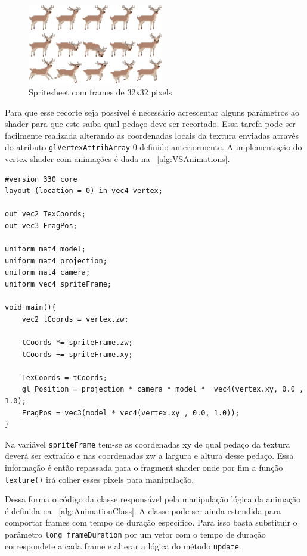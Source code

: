 \documentclass[12pt, 
openright, 
oneside, 
a4paper,    
brazil]{facom-ufu-abntex2}
\begin{document}
\begin{figure}[H]
	\centering
	\includegraphics[width=16em]{imagens/spritesheet.png}
	\caption{Spritesheet com frames de 32x32 pixels}
	\label{fig:spritesheetExample}
\end{figure}
Para que esse recorte seja possível é necessário acrescentar alguns parâmetros ao shader para que este saiba qual pedaço deve ser recortado. Essa tarefa pode ser facilmente realizada alterando as coordenadas locais da textura enviadas através do atributo \texttt{glVertexAttribArray} 0 definido anteriormente. A implementação do vertex shader com animações é dada na \lstlistingname~\ref{alg:VSAnimations}.


\begin{lstlisting}[caption=Vertex shader com animações, label={alg:VSAnimations}]
#version 330 core
layout (location = 0) in vec4 vertex;

out vec2 TexCoords;
out vec3 FragPos;

uniform mat4 model;
uniform mat4 projection;
uniform mat4 camera;
uniform vec4 spriteFrame;

void main(){
	vec2 tCoords = vertex.zw;

	tCoords *= spriteFrame.zw;
	tCoords += spriteFrame.xy;

	TexCoords = tCoords;
	gl_Position = projection * camera * model *  vec4(vertex.xy, 0.0 , 1.0);
	FragPos = vec3(model * vec4(vertex.xy , 0.0, 1.0));
}
\end{lstlisting}

Na variável \texttt{spriteFrame} tem-se as coordenadas xy de qual pedaço da textura deverá ser extraído e nas coordenadas zw a largura e altura desse pedaço. Essa informação é então repassada  para o fragment shader onde por fim a função \texttt{texture()} irá colher esses pixels para manipulação.

Dessa forma o código da classe responsável pela manipulação lógica da animação é definida na \lstlistingname~\ref{alg:AnimationClass}. A classe pode ser ainda estendida para comportar frames com tempo de duração específico. Para isso basta substituir o parâmetro \texttt{long frameDuration} por um vetor com o tempo de duração correspondete a cada frame e alterar a lógica do método \texttt{update}.
\end{document}
